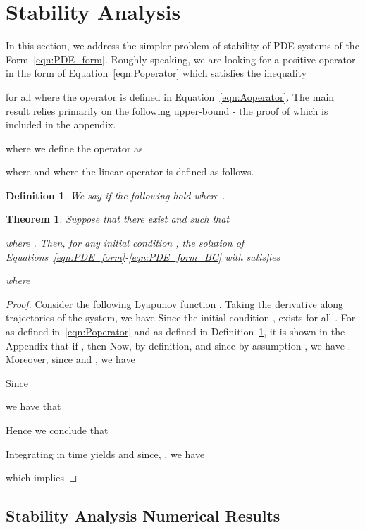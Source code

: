 \documentclass[9pt,journal,twocolumn]{IEEEtran}
\newtheorem{theorem}{Theorem}
\newtheorem{definition}{Definition}
\begin{document}
\section{Stability Analysis}\label{sec:stability}

In this section, we address the simpler problem of stability of PDE systems of the Form~\eqref{eqn:PDE_form}. Roughly speaking, we are looking for a positive operator in the form of Equation~\eqref{eqn:Poperator} which satisfies the inequality

for all  where the operator  is defined in Equation~\eqref{eqn:Aoperator}. The main result relies primarily on the following upper-bound - the proof of which is included in the appendix.

where we define the operator  as

where  and where the linear operator  is defined as follows.
\begin{definition}\label{def:stab_map}
We say  if the following hold
 where .
\end{definition}

\begin{theorem}\label{thm:stability}
Suppose that there exist  and  such that

where . Then, for any initial condition , the solution  of Equations~\eqref{eqn:PDE_form}-\eqref{eqn:PDE_form_BC} with  satisfies

where

\end{theorem}

\begin{proof}
 Consider the following Lyapunov function .
 Taking the derivative along trajectories of the system, we have
  Since the initial condition ,  exists for all . For  as defined in~\eqref{eqn:Poperator} and  as defined in Definition~\ref{def:stab_map}, it is shown in the Appendix that if , then
 Now, by definition,  and since by assumption , we have . Moreover, since  and , we have

Since

we have that

Hence we conclude that

Integrating in time yields  and since, , we have
 
 which implies
 
 \end{proof}

 \subsection{Stability Analysis Numerical Results}\label{stabannum}
\end{document}

